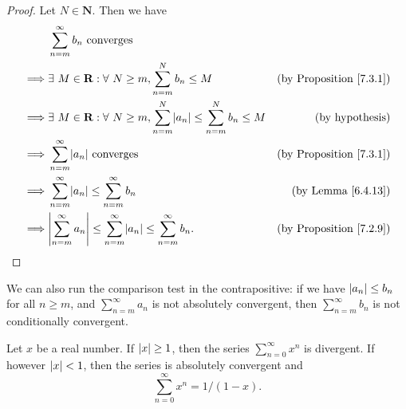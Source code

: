 \begin{proof}
    Let \(N \in \mathbf{N}\).
    Then we have
    \begin{align*}
                 & \sum_{n = m}^\infty b_n \text{ converges}                                                                                                     \\
        \implies & \exists\ M \in \mathbf{R} : \forall\ N \geq m, \sum_{n = m}^N b_n \leq M                                & \text{(by Proposition \ref{7.3.1})} \\
        \implies & \exists\ M \in \mathbf{R} : \forall\ N \geq m, \sum_{n = m}^N \abs*{a_n} \leq \sum_{n = m}^N b_n \leq M & \text{(by hypothesis)}              \\
        \implies & \sum_{n = m}^\infty \abs*{a_n} \text{ converges}                                                        & \text{(by Proposition \ref{7.3.1})} \\
        \implies & \sum_{n = m}^\infty \abs*{a_n} \leq \sum_{n = m}^\infty b_n                                             & \text{(by Lemma \ref{6.4.13})}      \\
        \implies & \abs*{\sum_{n = m}^\infty a_n} \leq \sum_{n = m}^\infty \abs*{a_n} \leq \sum_{n = m}^\infty b_n.        & \text{(by Proposition \ref{7.2.9})}
    \end{align*}
\end{proof}

\begin{note}
    We can also run the comparison test in the contrapositive:
    if we have \(\abs*{a_n} \leq b_n\) for all \(n \geq m\), and \(\sum_{n = m}^\infty a_n\) is not absolutely convergent, then \(\sum_{n = m}^\infty b_n\) is not conditionally convergent.
\end{note}

\begin{lemma}\label{7.3.3}
    Let \(x\) be a real number.
    If \(\abs*{x} \geq 1\), then the series \(\sum_{n = 0}^\infty x^n\) is divergent.
    If however \(\abs*{x} < 1\), then the series is absolutely convergent and
    \[
        \sum_{n = 0}^\infty x^n = 1 / (1 - x).
    \]
\end{lemma}

